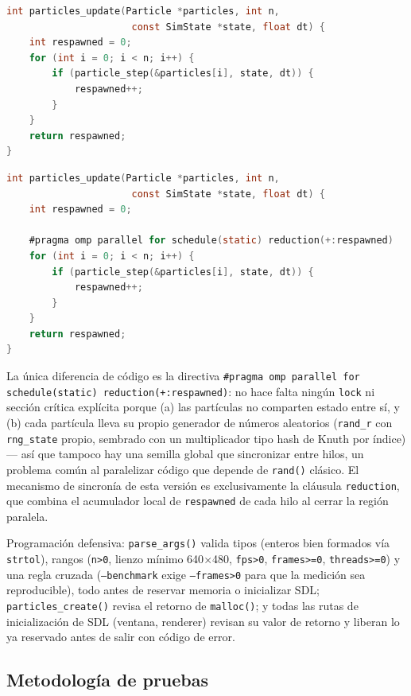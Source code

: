 \documentclass[12pt,letterpaper]{article}
\begin{document}
\begin{lstlisting}[language=C,caption={Version secuencial (src/seq/particle\_update.c)}]
int particles_update(Particle *particles, int n,
                      const SimState *state, float dt) {
    int respawned = 0;
    for (int i = 0; i < n; i++) {
        if (particle_step(&particles[i], state, dt)) {
            respawned++;
        }
    }
    return respawned;
}
\end{lstlisting}

\begin{lstlisting}[language=C,caption={Version paralela con OpenMP (src/par/particle\_update.c)}]
int particles_update(Particle *particles, int n,
                      const SimState *state, float dt) {
    int respawned = 0;

    #pragma omp parallel for schedule(static) reduction(+:respawned)
    for (int i = 0; i < n; i++) {
        if (particle_step(&particles[i], state, dt)) {
            respawned++;
        }
    }
    return respawned;
}
\end{lstlisting}

La única diferencia de código es la directiva \texttt{\#pragma omp
parallel for schedule(static) reduction(+:respawned)}: no hace falta
ningún \texttt{lock} ni sección crítica explícita porque (a) las
partículas no comparten estado entre sí, y (b) cada partícula lleva su
propio generador de números aleatorios (\texttt{rand\_r} con
\texttt{rng\_state} propio, sembrado con un multiplicador tipo hash de
Knuth por índice) --- así que tampoco hay una semilla global que
sincronizar entre hilos, un problema común al paralelizar código que
depende de \texttt{rand()} clásico. El mecanismo de sincronía de esta
versión es exclusivamente la cláusula \texttt{reduction}, que combina el
acumulador local de \texttt{respawned} de cada hilo al cerrar la región
paralela.

Programación defensiva: \texttt{parse\_args()} valida tipos (enteros bien
formados vía \texttt{strtol}), rangos (\texttt{n>0}, lienzo mínimo
640$\times$480, \texttt{fps>0}, \texttt{frames>=0}, \texttt{threads>=0})
y una regla cruzada (\texttt{--benchmark} exige \texttt{--frames>0}
para que la medición sea reproducible), todo antes de reservar memoria o
inicializar SDL; \texttt{particles\_create()} revisa el retorno de
\texttt{malloc()}; y todas las rutas de inicialización de SDL (ventana,
renderer) revisan su valor de retorno y liberan lo ya reservado antes de
salir con código de error.

\subsection{Metodología de pruebas}
\end{document}
